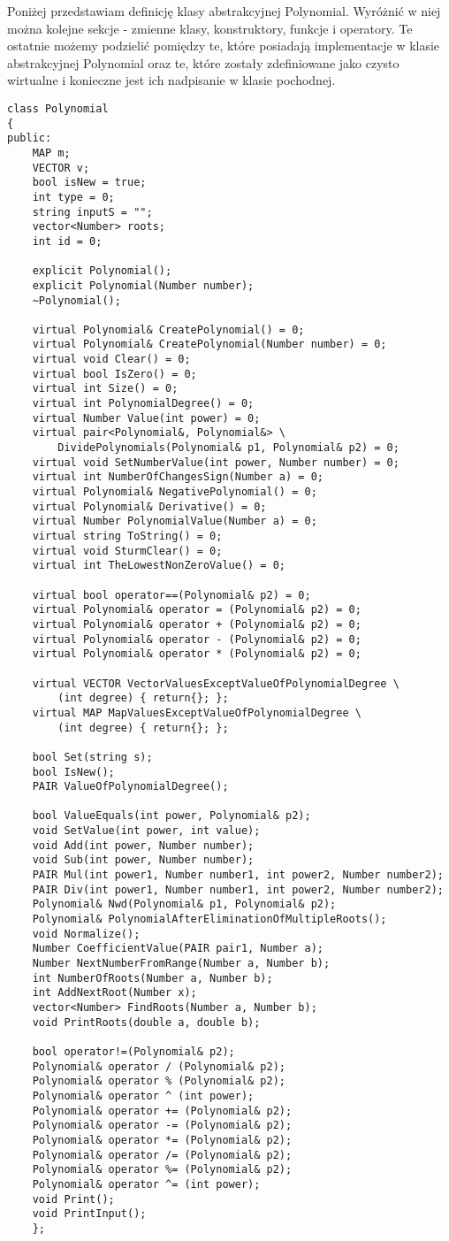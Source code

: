 \documentclass[twoside,a4paper]{book}
\begin{document}
Poniżej przedstawiam definicję klasy abstrakcyjnej Polynomial. Wyróżnić w niej można kolejne sekcje - zmienne klasy, konstruktory, funkcje i operatory. Te ostatnie możemy podzielić pomiędzy te, które posiadają implementacje w klasie abstrakcyjnej Polynomial oraz te, które zostały zdefiniowane jako czysto wirtualne i konieczne jest ich nadpisanie w klasie pochodnej.

\begin{lstlisting}
class Polynomial
{
public:
	MAP m;
	VECTOR v;
	bool isNew = true;
	int type = 0;
	string inputS = "";
	vector<Number> roots;
	int id = 0;
	
	explicit Polynomial();
	explicit Polynomial(Number number);
	~Polynomial();
	
	virtual Polynomial& CreatePolynomial() = 0;
	virtual Polynomial& CreatePolynomial(Number number) = 0;
	virtual void Clear() = 0;
	virtual bool IsZero() = 0;
	virtual int Size() = 0;
	virtual int PolynomialDegree() = 0;
	virtual Number Value(int power) = 0;
	virtual pair<Polynomial&, Polynomial&> \
		DividePolynomials(Polynomial& p1, Polynomial& p2) = 0;
	virtual void SetNumberValue(int power, Number number) = 0;
	virtual int NumberOfChangesSign(Number a) = 0;
	virtual Polynomial& NegativePolynomial() = 0;
	virtual Polynomial& Derivative() = 0;
	virtual Number PolynomialValue(Number a) = 0;
	virtual string ToString() = 0;
	virtual void SturmClear() = 0;
	virtual int TheLowestNonZeroValue() = 0;
	
	virtual bool operator==(Polynomial& p2) = 0;
	virtual Polynomial& operator = (Polynomial& p2) = 0;
	virtual Polynomial& operator + (Polynomial& p2) = 0;
	virtual Polynomial& operator - (Polynomial& p2) = 0;
	virtual Polynomial& operator * (Polynomial& p2) = 0;
	
	virtual VECTOR VectorValuesExceptValueOfPolynomialDegree \
		(int degree) { return{}; };
	virtual MAP MapValuesExceptValueOfPolynomialDegree \
		(int degree) { return{}; };
	
	bool Set(string s);
	bool IsNew();
	PAIR ValueOfPolynomialDegree();
	
	bool ValueEquals(int power, Polynomial& p2);
	void SetValue(int power, int value);
	void Add(int power, Number number);
	void Sub(int power, Number number);
	PAIR Mul(int power1, Number number1, int power2, Number number2);
	PAIR Div(int power1, Number number1, int power2, Number number2);
	Polynomial& Nwd(Polynomial& p1, Polynomial& p2);
	Polynomial& PolynomialAfterEliminationOfMultipleRoots();
	void Normalize();
	Number CoefficientValue(PAIR pair1, Number a);
	Number NextNumberFromRange(Number a, Number b);
	int NumberOfRoots(Number a, Number b);
	int AddNextRoot(Number x);
	vector<Number> FindRoots(Number a, Number b);
	void PrintRoots(double a, double b);
	
	bool operator!=(Polynomial& p2);
	Polynomial& operator / (Polynomial& p2);
	Polynomial& operator % (Polynomial& p2);
	Polynomial& operator ^ (int power);
	Polynomial& operator += (Polynomial& p2);
	Polynomial& operator -= (Polynomial& p2);
	Polynomial& operator *= (Polynomial& p2);
	Polynomial& operator /= (Polynomial& p2);
	Polynomial& operator %= (Polynomial& p2);
	Polynomial& operator ^= (int power);
	void Print();
	void PrintInput();
	};
\end{lstlisting}
\end{document}
